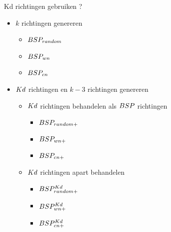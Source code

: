 \documentclass[11pt,t]{beamer}
\begin{document}
\begin{frame}{Kd richtingen gebruiken ?}
	\begin{itemize}
		\item $k$ richtingen genereren
		\begin{itemize}
			\item $BSP_{random}$
			\item $BSP_{wn}$
			\item $BSP_{cn}$
		\end{itemize}
		\item $Kd$ richtingen en $k - 3$ richtingen genereren
		\begin{itemize}
			\item $Kd$ richtingen behandelen als $BSP$ richtingen
		\begin{itemize}
			\item $BSP_{random+}$
			\item $BSP_{wn+}$
			\item $BSP_{cn+}$
		\end{itemize}
		\item $Kd$ richtingen apart behandelen
		\begin{itemize}
			\item $BSP^{Kd}_{random+}$
			\item $BSP^{Kd}_{wn+}$
			\item $BSP^{Kd}_{cn+}$
		\end{itemize}
	\end{itemize}


	\end{itemize}
\end{frame}
\end{document}
